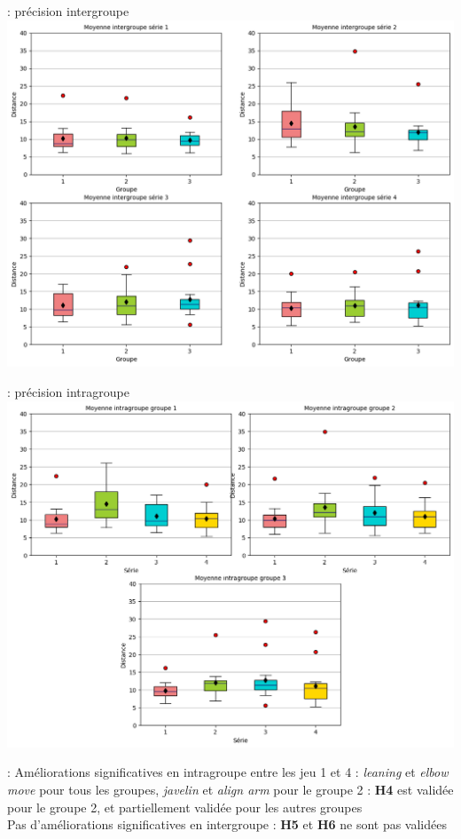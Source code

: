 \documentclass[svgnames]{beamer}
\begin{document}
	\begin{frame}{\subsecname : précision intergroupe}
		\centering
		\includegraphics[scale=0.4]{img/Precision_All_data_intergroupe.png}
	\end{frame}
	
	\begin{frame}{\subsecname : précision intragroupe}
		\centering
		\includegraphics[scale=0.4]{img/Precision_All_data_intragroupe.png}
	\end{frame}
	
	\begin{frame}{\subsecname : \subsubsecname}
		Améliorations significatives en intragroupe entre les jeu 1 et 4 : \textit{leaning} et \textit{elbow move} pour tous les groupes, \textit{javelin} et \textit{align arm} pour le groupe 2 : \textbf{H4} est validée pour le groupe 2, et partiellement validée pour les autres groupes\\
		\vspace{1cm}
		Pas d'améliorations significatives en intergroupe : \textbf{H5} et \textbf{H6} ne sont pas validées
		
	\end{frame}
	
\end{document}
